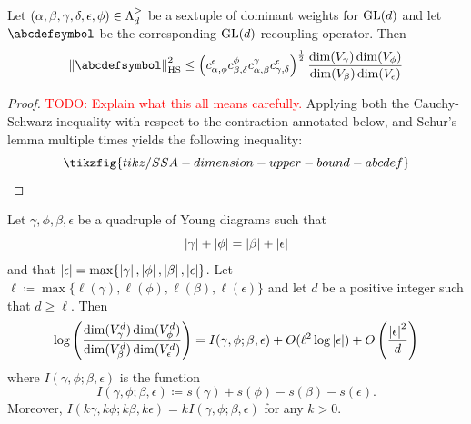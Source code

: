 \documentclass[notitlepage, 10pt]{article}
\begin{document}
\begin{thm}
    \label{thm:ud_recouple_bound}
    Let $(\alpha,\beta,\gamma,\delta,\epsilon,\phi) \in \Lambda^{\geq}_{d}$ be a sextuple of dominant weights for $\operatorname{GL}(d)$ and let $\abcdefsymbol$ be the corresponding $\operatorname{GL}(d)$-recoupling operator. 
    Then
    \begin{equation}
        \norm{\abcdefsymbol}_{\text{HS}}^{2}
        \leq \left(c_{\alpha,\phi}^{\epsilon}c_{\beta,\delta}^{\phi}c_{\alpha,\beta}^{\gamma}c_{\gamma,\delta}^{\epsilon}\right)^{\frac{1}{2}} \frac{\dim(V_{\gamma}) \dim(V_{\phi})}{\dim(V_{\beta}) \dim(V_{\epsilon})}
    \end{equation}
\end{thm}
\begin{proof}
    \textcolor{red}{TODO: Explain what this all means carefully.}
    Applying both the Cauchy-Schwarz inequality with respect to the contraction annotated below, and Schur's lemma multiple times yields the following inequality:
    \begin{equation}
        \tikzfig{tikz/SSA-dimension-upper-bound-abcdef}
    \end{equation}
\end{proof}
\begin{lem}
    \label{lem:asymptotic_dimension_ratio}
    Let $\gamma,\phi,\beta,\epsilon$ be a quadruple of Young diagrams such that 
    \begin{equation}
        \label{eq:balanced_sizes}
        \left|\gamma\right|+\left|\phi\right| = \left|\beta\right|+\left|\epsilon\right|
    \end{equation}
    and that $\left|\epsilon\right| = \max\{\left|\gamma\right|, \left|\phi\right|, \left|\beta\right|, \left|\epsilon\right|\}$.
    Let $\ell \coloneqq \max\{\ell(\gamma), \ell(\phi), \ell(\beta), \ell(\epsilon) \}$ and let $d$ be a positive integer such that $d \geq \ell$.
    Then
    \begin{equation}
        \log\left(\frac{\dim(V_{\gamma}^d) \dim(V_{\phi}^d)}{\dim(V_{\beta}^d) \dim(V_{\epsilon}^d)}\right)
        = I(\gamma,\phi;\beta,\epsilon) + O(\ell^2 \log \left|\epsilon\right|) + O\left(\frac{\left|\epsilon\right|^2}{d}\right)
        \label{eq:asymptotic_dimension_ratio}
    \end{equation}
    where $I(\gamma,\phi;\beta,\epsilon)$ is the function
    \begin{equation}
        I(\gamma,\phi;\beta,\epsilon) \coloneqq s(\gamma) + s(\phi) - s(\beta) - s(\epsilon).
    \end{equation}
    Moreover, $I(k\gamma,k\phi;k\beta,k\epsilon) = k I(\gamma,\phi;\beta,\epsilon)$ for any $k > 0$.
\end{lem}
\end{document}
